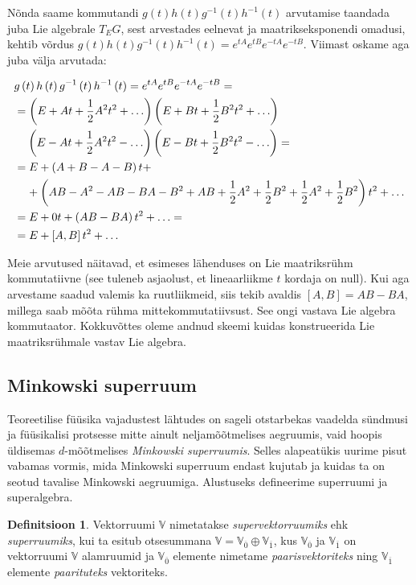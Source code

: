 \documentclass[12pt,a4paper,oneside]{article}
\theoremstyle{plain}
\theoremstyle{definition}
\newtheorem{definitsioon}{Definitsioon}[section]
\numberwithin{equation}{section}
\def\V{{\mathbb V}}
\begin{document}
Nõnda saame kommutandi 
$g\left(t\right) h\left(t\right) g^{-1}\left(t\right) 
h^{-1}\left(t\right)$ arvutamise taandada juba Lie algebrale 
$T_E G$, sest arvestades eelnevat ja maatrikseksponendi omadusi, 
kehtib võrdus $g\left(t\right) h\left(t\right) g^{-1}\left(t\right) 
h^{-1}\left(t\right) = e^{tA} e^{tB} e^{-tA} e^{-tB}$. 
Viimast oskame aga juba välja arvutada:

\begin{align*}
&g\left(t\right) h\left(t\right) g^{-1}\left(t\right) 
	h^{-1}\left(t\right) = e^{tA} e^{tB} e^{-tA} e^{-tB} = \\
&= \left(E + At + \frac{1}{2}A^2 t^2 + \ldots \right) 
  \left(E + Bt + \frac{1}{2}B^2 t^2 + \ldots \right) \\
&\hphantom{=}\ \left(E - At + \frac{1}{2}A^2 t^2 - \ldots \right) 
	\left(E - Bt + \frac{1}{2}B^2 t^2 - \ldots \right) = \\
&= E + \left(A + B - A - B\right)t + \\
	&\hphantom{=\ }+ \left(AB - A^2 - AB - BA - B^2 + AB + \frac{1}{2} A^2 + 
	\frac{1}{2} B^2 + \frac{1}{2} A^2 + \frac{1}{2} B^2\right)t^2 + \ldots \\
&= E + 0t + \left(AB - BA\right)t^2 + \ldots = \\
&= E + \left[A, B\right]t^2 + \ldots
\end{align*}

Meie arvutused näitavad, et esimeses lähenduses on Lie maatriksrühm 
kommutatiivne (see tuleneb asjaolust, et lineaarliikme $t$ kordaja 
on null). Kui aga arvestame saadud valemis ka ruutliikmeid, siis 
tekib avaldis $\left[A,B\right] = AB - BA$, millega saab mõõta rühma 
mittekommutatiivsust. See ongi vastava Lie algebra kommutaator. 
Kokkuvõttes oleme andnud skeemi kuidas konstrueerida Lie 
maatriksrühmale vastav Lie algebra.

\subsection{Minkowski superruum}

Teoreetilise füüsika vajadustest lähtudes on sageli otstarbekas 
vaadelda sünd\-musi ja füüsikalisi protsesse mitte ainult 
neljamõõtmelises aegruumis, vaid hoopis üldisemas $d$-mõõtmelises
\emph{Minkowski superruumis}. Selles alapeatükis uurime pisut 
vabamas vormis, mida Minkowski superruum endast kujutab ja kuidas 
ta on seotud tavalise Minkowski aegruumiga. Alustuseks defineerime 
superruumi ja superalgebra.

\begin{definitsioon}
Vektorruumi $\V$ nimetatakse \emph{supervektorruumiks} ehk 
\emph{superruumiks}, kui ta esitub otsesummana 
$\V = \V_{\overline{0}} \oplus \V_{\overline{1}}$, kus 
$\V_{\overline{0}}$ ja $\V_{\overline{1}}$ on vektorruumi $\V$ 
alamruumid ja $\V_{\overline{0}}$ elemente nimetame 
\emph{paarisvektoriteks} ning $\V_{\overline{1}}$ elemente 
\emph{paarituteks} vektoriteks.
\end{definitsioon}
\end{document}
